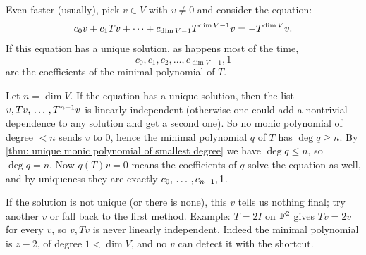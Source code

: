 Even faster (usually), pick $v \in V$ with $v \neq 0$ and consider the equation:
\begin{equation}
  c_0v + c_1Tv + \cdots + c_{\operatorname{dim} V-1}T^{\operatorname{dim} V-1}v=-T^{\operatorname{dim} V}v.
\end{equation}
If this equation has a unique solution, as happens most of the time,
\begin{equation}
  c_0, c_1, c_2, \dots, c_{\dim V-1}, 1
\end{equation}
are the coefficients of the minimal polynomial of $T$.

\begin{ainote}
  Let $n = \dim V$. If the equation has a unique solution, then the list $v, Tv, {\, \ldots \,\,}, T^{n-1}v$ is linearly independent (otherwise one could add a nontrivial dependence to any solution and get a second one). So no monic polynomial of degree $< n$ sends $v$ to $0$, hence the minimal polynomial $q$ of $T$ has $\deg q \geq n$. By \ref{thm: unique monic polynomial of smallest degree} we have $\deg q \leq n$, so $\deg q = n$. Now $q(T)v = 0$ means the coefficients of $q$ solve the equation as well, and by uniqueness they are exactly $c_0, {\, \ldots \,\,}, c_{n-1}, 1$.

  If the solution is not unique (or there is none), this $v$ tells us nothing final; try another $v$ or fall back to the first method. Example: $T = 2I$ on $\mathbb{F}^2$ gives $Tv = 2v$ for every $v$, so $v, Tv$ is never linearly independent. Indeed the minimal polynomial is $z - 2$, of degree $1 < \dim V$, and no $v$ can detect it with the shortcut.
\end{ainote}

